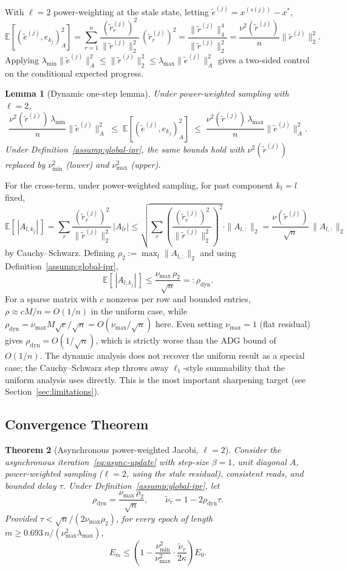 \documentclass[pdflatex,sn-mathphys-num]{sn-jnl}%
\newcommand{\E}{\mathbb{E}}
\newcommand{\Anorm}[1]{\|#1\|_{A}}
\newcommand{\lmin}{\lambda_{\min}}
\newcommand{\lmax}{\lambda_{\max}}
\theoremstyle{thmstyleone}%
\newtheorem{theorem}{Theorem}%
\newtheorem{lemma}[theorem]{Lemma}
\theoremstyle{thmstyletwo}%
\theoremstyle{thmstylethree}%
\begin{document}
With $\ell = 2$ power-weighting at the stale state, letting $\tilde e^{(j)} = x^{(s(j))} - x^*$,
$$
\E[(\tilde e^{(j)}, e_{k_j})_A^2] = \sum_{r=1}^n \frac{(\tilde r_r^{(j)})^2}{\|\tilde r^{(j)}\|_2^2}\, (\tilde r_r^{(j)})^2 = \frac{\|\tilde r^{(j)}\|_4^4}{\|\tilde r^{(j)}\|_2^2} = \frac{\nu^2(\tilde r^{(j)})}{n}\|\tilde r^{(j)}\|_2^2.
$$
Applying $\lmin \Anorm{\tilde e^{(j)}}^2 \leq \|\tilde r^{(j)}\|_2^2 \leq \lmax \Anorm{\tilde e^{(j)}}^2$ gives a two-sided control on the conditional expected progress.

\begin{lemma}[Dynamic one-step lemma]
\label{lem:dynamic-async-1}
Under power-weighted sampling with $\ell = 2$,
$$
\frac{\nu^2(\tilde r^{(j)})\,\lmin}{n}\Anorm{\tilde e^{(j)}}^2 \;\leq\; \E[(\tilde e^{(j)}, e_{k_j})_A^2] \;\leq\; \frac{\nu^2(\tilde r^{(j)})\,\lmax}{n}\Anorm{\tilde e^{(j)}}^2.
$$
Under Definition~\ref{assump:global-ipr}, the same bounds hold with $\nu^2(\tilde r^{(j)})$ replaced by $\nu_{\min}^2$ (lower) and $\nu_{\max}^2$ (upper).
\end{lemma}

For the cross-term, under power-weighted sampling, for past component $k_t = l$ fixed,
$$
\E[\,|A_{l, k_j}|\,] = \sum_r \frac{(\tilde r_r^{(j)})^2}{\|\tilde r^{(j)}\|_2^2}\,|A_{lr}|
\leq \sqrt{\sum_r \left(\frac{(\tilde r_r^{(j)})^2}{\|\tilde r^{(j)}\|_2^2}\right)^{\!2}}\cdot\|A_{l,:}\|_2
= \frac{\nu(\tilde r^{(j)})}{\sqrt n}\,\|A_{l,:}\|_2
$$
by Cauchy--Schwarz. Defining $\rho_2 := \max_l \|A_{l,:}\|_2$ and using Definition~\ref{assump:global-ipr},
$$
\E[\,|A_{l, k_j}|\,] \leq \frac{\nu_{\max}\,\rho_2}{\sqrt n} =: \rho_{\text{dyn}}.
$$
For a sparse matrix with $c$ nonzeros per row and bounded entries, $\rho \approx cM/n = O(1/n)$ in the uniform case, while $\rho_{\text{dyn}} = \nu_{\max} M\sqrt c/\sqrt n = O(\nu_{\max}/\sqrt n)$ here. Even setting $\nu_{\max} = 1$ (flat residual) gives $\rho_{\text{dyn}} = O(1/\sqrt n)$, which is strictly worse than the ADG bound of $O(1/n)$. The dynamic analysis does not recover the uniform result as a special case; the Cauchy--Schwarz step throws away $\ell_1$-style summability that the uniform analysis uses directly. This is the most important sharpening target (see Section~\ref{sec:limitations}).


\subsection{Convergence Theorem}

\begin{theorem}[Asynchronous power-weighted Jacobi, $\ell = 2$]
\label{thm:async-power-weighted}
Consider the asynchronous iteration~\eqref{eq:async-update} with step-size $\beta = 1$, unit diagonal $A$, power-weighted sampling ($\ell = 2$, using the stale residual), consistent reads, and bounded delay $\tau$. Under Definition~\ref{assump:global-ipr}, let
$$
\rho_{\text{dyn}} = \frac{\nu_{\max}\,\rho_2}{\sqrt n}, \qquad \tilde\nu_\tau = 1 - 2\rho_{\text{dyn}}\tau.
$$
Provided $\tau < \sqrt n / (2\nu_{\max}\rho_2)$, for every epoch of length $m \geq 0.693\,n/(\nu_{\max}^2\lmax)$,
$$
E_m \leq \left(1 - \frac{\nu_{\min}^2}{\nu_{\max}^2} \cdot \frac{\tilde\nu_\tau}{2\kappa}\right) E_0.
$$
\end{theorem}
\end{document}
